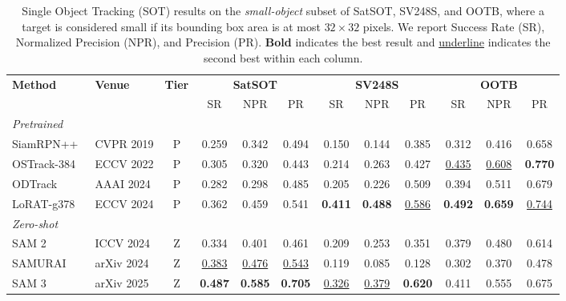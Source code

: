 \begin{table}[t]
\centering
\caption{Single Object Tracking (SOT) results on the \emph{small-object} subset of
SatSOT, SV248S, and OOTB, where a target is considered small if its bounding box
area is at most $32 \times 32$ pixels. We report Success Rate (SR),
Normalized Precision (NPR), and Precision (PR).
\textbf{Bold} indicates the best result and \underline{underline} indicates the
second best within each column.}
\label{tab:sot_results_small}
\setlength{\tabcolsep}{4pt}
\renewcommand{\arraystretch}{1.15}
\begin{tabular}{l l c ccc ccc ccc}
\toprule
\multirow{2}{*}{\textbf{Method}} & \multirow{2}{*}{\textbf{Venue}} & \multirow{2}{*}{\textbf{Tier}}
 & \multicolumn{3}{c}{\textbf{SatSOT}}
 & \multicolumn{3}{c}{\textbf{SV248S}}
 & \multicolumn{3}{c}{\textbf{OOTB}} \\
\cmidrule(lr){4-6} \cmidrule(lr){7-9} \cmidrule(lr){10-12}
 & & & SR & NPR & PR & SR & NPR & PR & SR & NPR & PR \\
\midrule
\multicolumn{12}{l}{\textit{Pretrained}} \\
SiamRPN++~\cite{li2019siamrpn++}    & CVPR 2019  & P & 0.259             & 0.342             & 0.494             & 0.150             & 0.144             & 0.385             & 0.312             & 0.416             & 0.658             \\
OSTrack-384~\cite{ye2022joint}  & ECCV 2022  & P & 0.305             & 0.320             & 0.443             & 0.214             & 0.263             & 0.427             & \underline{0.435} & \underline{0.608} & \textbf{0.770}    \\
ODTrack~\cite{zheng2024odtrack}      & AAAI 2024  & P & 0.282             & 0.298             & 0.485             & 0.205             & 0.226             & 0.509             & 0.394             & 0.511             & 0.679             \\
LoRAT-g378~\cite{lin2024tracking}   & ECCV 2024  & P & 0.362             & 0.459             & 0.541             & \textbf{0.411}    & \textbf{0.488}    & \underline{0.586} & \textbf{0.492}    & \textbf{0.659}    & \underline{0.744} \\
\midrule
\multicolumn{12}{l}{\textit{Zero-shot}} \\
SAM 2~\cite{ravi2024sam}        & ICCV 2024  & Z & 0.334             & 0.401             & 0.461             & 0.209             & 0.253             & 0.351             & 0.379             & 0.480             & 0.614             \\
SAMURAI~\cite{yang2026samurai}      & arXiv 2024 & Z & \underline{0.383} & \underline{0.476} & \underline{0.543} & 0.119             & 0.085             & 0.128             & 0.302             & 0.370             & 0.478             \\
SAM 3~\cite{carion2026sam3}        & arXiv 2025 & Z & \textbf{0.487}    & \textbf{0.585}    & \textbf{0.705}    & \underline{0.326} & \underline{0.379} & \textbf{0.620}    & 0.411             & 0.555             & 0.675             \\
\bottomrule
\end{tabular}
\end{table}

